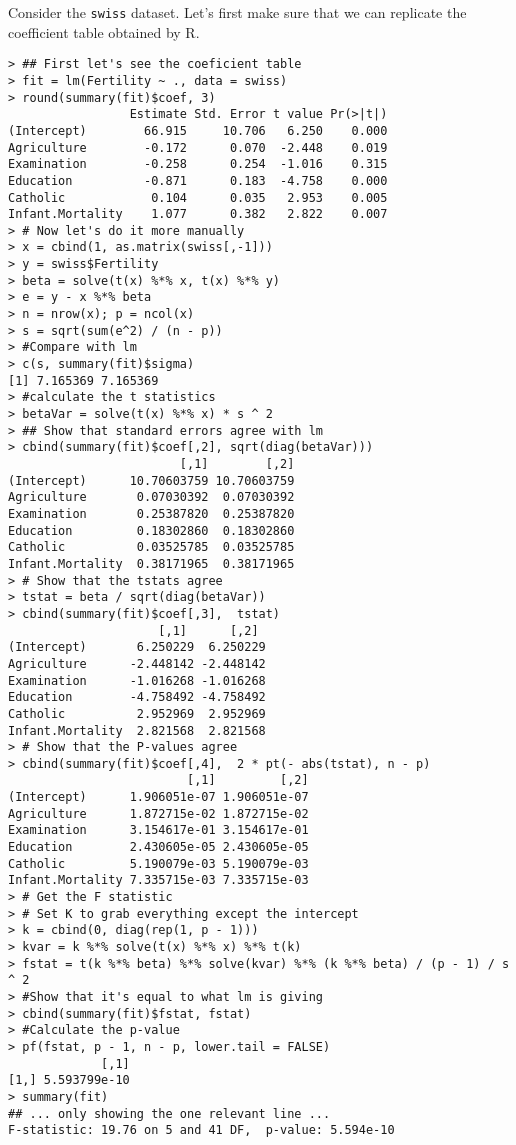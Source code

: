 Consider the \texttt{swiss} dataset. Let's first make sure that we can replicate
the coefficient table obtained by R.
\begin{verbatim}
> ## First let's see the coeficient table
> fit = lm(Fertility ~ ., data = swiss)
> round(summary(fit)$coef, 3)
                 Estimate Std. Error t value Pr(>|t|)
(Intercept)        66.915     10.706   6.250    0.000
Agriculture        -0.172      0.070  -2.448    0.019
Examination        -0.258      0.254  -1.016    0.315
Education          -0.871      0.183  -4.758    0.000
Catholic            0.104      0.035   2.953    0.005
Infant.Mortality    1.077      0.382   2.822    0.007
> # Now let's do it more manually
> x = cbind(1, as.matrix(swiss[,-1]))
> y = swiss$Fertility
> beta = solve(t(x) %*% x, t(x) %*% y)
> e = y - x %*% beta
> n = nrow(x); p = ncol(x)
> s = sqrt(sum(e^2) / (n - p))
> #Compare with lm
> c(s, summary(fit)$sigma)
[1] 7.165369 7.165369
> #calculate the t statistics
> betaVar = solve(t(x) %*% x) * s ^ 2 
> ## Show that standard errors agree with lm
> cbind(summary(fit)$coef[,2], sqrt(diag(betaVar)))
                        [,1]        [,2]
(Intercept)      10.70603759 10.70603759
Agriculture       0.07030392  0.07030392
Examination       0.25387820  0.25387820
Education         0.18302860  0.18302860
Catholic          0.03525785  0.03525785
Infant.Mortality  0.38171965  0.38171965
> # Show that the tstats agree
> tstat = beta / sqrt(diag(betaVar))
> cbind(summary(fit)$coef[,3],  tstat)
                     [,1]      [,2]
(Intercept)       6.250229  6.250229
Agriculture      -2.448142 -2.448142
Examination      -1.016268 -1.016268
Education        -4.758492 -4.758492
Catholic          2.952969  2.952969
Infant.Mortality  2.821568  2.821568
> # Show that the P-values agree
> cbind(summary(fit)$coef[,4],  2 * pt(- abs(tstat), n - p)
                         [,1]         [,2]
(Intercept)      1.906051e-07 1.906051e-07
Agriculture      1.872715e-02 1.872715e-02
Examination      3.154617e-01 3.154617e-01
Education        2.430605e-05 2.430605e-05
Catholic         5.190079e-03 5.190079e-03
Infant.Mortality 7.335715e-03 7.335715e-03
> # Get the F statistic
> # Set K to grab everything except the intercept
> k = cbind(0, diag(rep(1, p - 1)))
> kvar = k %*% solve(t(x) %*% x) %*% t(k)
> fstat = t(k %*% beta) %*% solve(kvar) %*% (k %*% beta) / (p - 1) / s ^ 2
> #Show that it's equal to what lm is giving
> cbind(summary(fit)$fstat, fstat)
> #Calculate the p-value
> pf(fstat, p - 1, n - p, lower.tail = FALSE)
             [,1]
[1,] 5.593799e-10
> summary(fit)
## ... only showing the one relevant line ...
F-statistic: 19.76 on 5 and 41 DF,  p-value: 5.594e-10
\end{verbatim}




